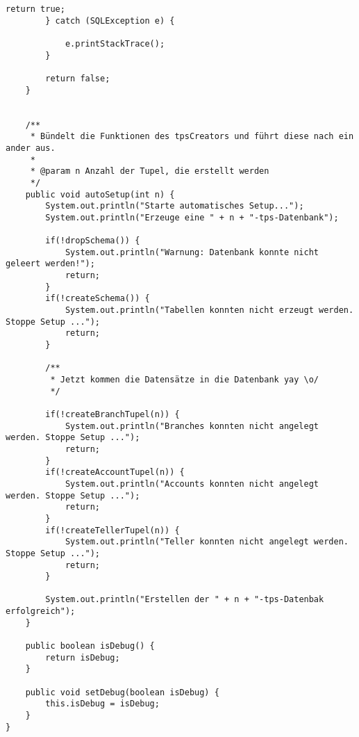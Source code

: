 \begin{lstlisting}[caption={TpsCreatorOldStatements}, label={lst:tpsoldv2}]
			return true;
		} catch (SQLException e) {

			e.printStackTrace();
		}
		
		return false;
	}
	
	
	/**
	 * Bündelt die Funktionen des tpsCreators und führt diese nach ein ander aus.
	 * 
	 * @param n Anzahl der Tupel, die erstellt werden
	 */
	public void autoSetup(int n) {
		System.out.println("Starte automatisches Setup...");
		System.out.println("Erzeuge eine " + n + "-tps-Datenbank");
		
		if(!dropSchema()) {
			System.out.println("Warnung: Datenbank konnte nicht geleert werden!");
			return;
		}
		if(!createSchema()) {
			System.out.println("Tabellen konnten nicht erzeugt werden. Stoppe Setup ...");
			return;
		}
		
		/**
		 * Jetzt kommen die Datensätze in die Datenbank yay \o/
		 */
		
		if(!createBranchTupel(n)) {
			System.out.println("Branches konnten nicht angelegt werden. Stoppe Setup ...");
			return;
		}
		if(!createAccountTupel(n)) {
			System.out.println("Accounts konnten nicht angelegt werden. Stoppe Setup ...");
			return;
		}
		if(!createTellerTupel(n)) {
			System.out.println("Teller konnten nicht angelegt werden. Stoppe Setup ...");
			return;
		}
		
		System.out.println("Erstellen der " + n + "-tps-Datenbak erfolgreich");
	}

	public boolean isDebug() {
		return isDebug;
	}

	public void setDebug(boolean isDebug) {
		this.isDebug = isDebug;
	}
}
\end{lstlisting}
